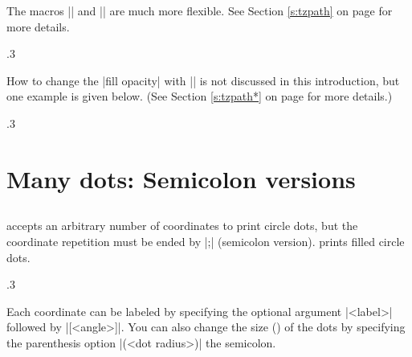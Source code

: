 The macros |\tzpath| and |\tzpath*| are much more flexible. See Section \ref{s:tzpath} on page \pageref{s:tzpath} for more details.


\begin{tzcode}{.3}
\end{tzcode}

How to change the |fill opacity| with |\tzpath*| is not discussed in this introduction, but one example is given below. (See Section \ref{s:tzpath*} on page \pageref{s:tzpath*} for more details.)

\begin{tzcode}{.3}
\end{tzcode}



\section{Many dots: Semicolon versions}
\label{si:manydots}

\subsection{\protect\cmd{\tzcdots(*)}}
\label{ssi:tzcdots}

\icmd{\tzcdots} accepts an arbitrary number of coordinates to print circle dots, but the coordinate repetition must be ended by |;| (semicolon version).
\icmd{\tzcdots*} prints filled circle dots.

\begin{tzcode}{.3}
\end{tzcode}

Each coordinate can be labeled by specifying the optional argument |{<label>}| followed by |[<angle>]|. You can also change the size () of the dots by specifying the  parenthesis option |(<dot radius>)|  the semicolon.

